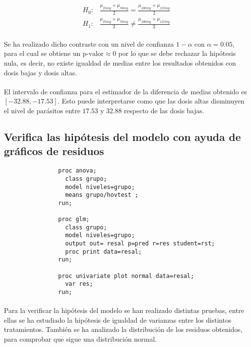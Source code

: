 \documentclass{article}
\begin{document}
      \begin{align}
        H_0:& \frac{\mu_{25mg} + \mu_{50mg}}{2} = \frac{\mu_{100mg} +\mu_{125mg}}{2} \\
        H_1:& \frac{\mu_{25mg} + \mu_{50mg}}{2} \neq \frac{\mu_{100mg} +\mu_{125mg}}{2}
      \end{align}

      \paragraph{}
      Se ha realizado dicho contraste con un nivel de confianza $1-\alpha$ con $\alpha = 0.05 $, para el cual se obtiene un $\text{p-valor}\approx 0$ por lo que se debe rechazar la hipótesis nula, es decir, no existe igualdad de medias entre los resultados obtenidos con dosis bajas y dosis altas.

      \paragraph{}
      El intervalo de confianza para el estimador de la diferencia de medias obtenido es $[-32.88, -17.53]$. Esto puede interpretarse como que las dosis altas disminuyen el nivel de parásitos entre $17.53$ y $32.88$ respecto de las dosis bajas.

    \subsection{Verifica las hipótesis del modelo con ayuda de gráficos de residuos}

      \begin{figure}[h]
        \centering
        \begin{verbatim}
          proc anova;
            class grupo;
            model niveles=grupo;
            means grupo/hovtest ;
          run;

          proc glm;
            class grupo;
            model niveles=grupo;
            output out= resal p=pred r=res student=rst;
            proc print data=resal;
          run;

          proc univariate plot normal data=resal;
            var res;
          run;
        \end{verbatim}
        \caption{}
        \label{code:sas_8}
      \end{figure}

      \paragraph{}
      Para la verificar la hipótesis del modelo se han realizado distintas pruebas, entre ellas se ha estudiado la hipótesis de igualdad de varianzas entre los distintos tratamientos. También se ha analizado la distribución de los residuos obtenidos, para comprobar que sigue una distribución normal.
\end{document}
